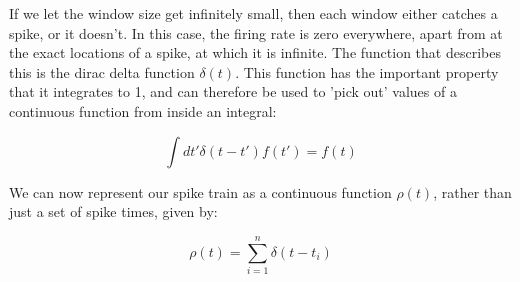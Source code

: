 \documentclass{article}
\begin{document}
\begin{figure}[ht]
\centering
\end{figure}

If we let the window size get infinitely small, then each window either catches a spike, or it doesn't. In this case, the firing rate is zero everywhere, apart from at the exact locations of a spike, at which it is infinite. The function that describes this is the dirac delta function $\delta (t)$. This function has the important property that it integrates to 1, and can therefore be used to 'pick out' values of a continuous function from inside an integral:

\begin{equation*}
    \int dt' \delta (t-t') f(t') = f(t)
\end{equation*}

We can now represent our spike train as a continuous function $\rho (t)$, rather than just a set of spike times, given by:

\begin{equation*}
    \rho (t) = \sum_{i=1}^n \delta(t-t_i)
\end{equation*}
\end{document}
